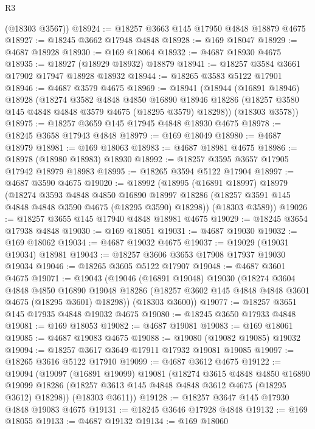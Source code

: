\begin{lexlean}{R3}
\begin{coremodule}
      (@18303 @3567))
@18924 := @18257 @3663 @145 @17950 @4848 @18879 @4675
@18927 := @18245 @3662 @17948 @4848
@18928 := @169 @18047
@18929 := @4687 @18928
@18930 := @169 @18064
@18932 := @4687 @18930 @4675
@18935 := @18927 (@18929 @18932) @18879
@18941 := @18257 @3584 @3661 @17902 @17947 @18928 @18932
@18944 := @18265 @3583 @5122 @17901
@18946 := @4687 @3579 @4675
@18969 := @18941
    (@18944
      (@16891 @18946)
      @18928
      (@18274
        @3582
        @4848
        @4850
        @16890
        @18946
        @18286
        (@18257 @3580 @145 @4848 @4848 @3579 @4675 (@18295 @3579) @18298))
      (@18303 @3578))
@18975 := @18257 @3659 @145 @17945 @4848 @18930 @4675
@18978 := @18245 @3658 @17943 @4848
@18979 := @169 @18049
@18980 := @4687 @18979
@18981 := @169 @18063
@18983 := @4687 @18981 @4675
@18986 := @18978 (@18980 @18983) @18930
@18992 := @18257 @3595 @3657 @17905 @17942 @18979 @18983
@18995 := @18265 @3594 @5122 @17904
@18997 := @4687 @3590 @4675
@19020 := @18992
    (@18995
      (@16891 @18997)
      @18979
      (@18274
        @3593
        @4848
        @4850
        @16890
        @18997
        @18286
        (@18257 @3591 @145 @4848 @4848 @3590 @4675 (@18295 @3590) @18298))
      (@18303 @3589))
@19026 := @18257 @3655 @145 @17940 @4848 @18981 @4675
@19029 := @18245 @3654 @17938 @4848
@19030 := @169 @18051
@19031 := @4687 @19030
@19032 := @169 @18062
@19034 := @4687 @19032 @4675
@19037 := @19029 (@19031 @19034) @18981
@19043 := @18257 @3606 @3653 @17908 @17937 @19030 @19034
@19046 := @18265 @3605 @5122 @17907
@19048 := @4687 @3601 @4675
@19071 := @19043
    (@19046
      (@16891 @19048)
      @19030
      (@18274
        @3604
        @4848
        @4850
        @16890
        @19048
        @18286
        (@18257 @3602 @145 @4848 @4848 @3601 @4675 (@18295 @3601) @18298))
      (@18303 @3600))
@19077 := @18257 @3651 @145 @17935 @4848 @19032 @4675
@19080 := @18245 @3650 @17933 @4848
@19081 := @169 @18053
@19082 := @4687 @19081
@19083 := @169 @18061
@19085 := @4687 @19083 @4675
@19088 := @19080 (@19082 @19085) @19032
@19094 := @18257 @3617 @3649 @17911 @17932 @19081 @19085
@19097 := @18265 @3616 @5122 @17910
@19099 := @4687 @3612 @4675
@19122 := @19094
    (@19097
      (@16891 @19099)
      @19081
      (@18274
        @3615
        @4848
        @4850
        @16890
        @19099
        @18286
        (@18257 @3613 @145 @4848 @4848 @3612 @4675 (@18295 @3612) @18298))
      (@18303 @3611))
@19128 := @18257 @3647 @145 @17930 @4848 @19083 @4675
@19131 := @18245 @3646 @17928 @4848
@19132 := @169 @18055
@19133 := @4687 @19132
@19134 := @169 @18060

\end{coremodule}
\end{lexlean}
